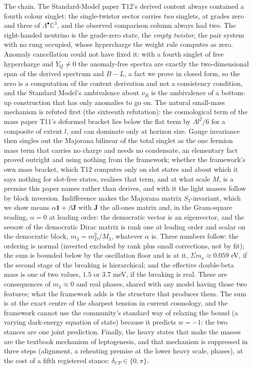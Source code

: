 \documentclass[11pt]{article}
\theoremstyle{definition}
\theoremstyle{plain}
\providecommand{\C}{}\renewcommand{\C}{\mathbb{C}}
\providecommand{\J}{}\renewcommand{\J}{\mathbf{J}}
\providecommand{\mnu}{}\renewcommand{\mnu}{\Sigma m_{\nu}}
\begin{document}
The chain. The Standard-Model paper T12's derived content always contained a fourth colour singlet: the single-twistor sector carries \emph{two} singlets, at grades zero and three of $\Lambda^{\bullet}\C^{3}$, and the observed comparison column always had two. The right-handed neutrino is the grade-zero state, the \emph{empty twistor}, the pair system with no rung occupied, whose hypercharge the weight rule computes as zero. Anomaly cancellation could not have fixed it: with a fourth singlet of free hypercharge and $Y_{Q} \neq 0$ the anomaly-free spectra are exactly the two-dimensional span of the derived spectrum and $B - L$, a fact we prove in closed form, so the zero is a computation of the content derivation and not a consistency condition, and the Standard Model's ambivalence about $\nu_{R}$ is the ambivalence of a bottom-up construction that has only anomalies to go on. The natural small-mass mechanism is refuted first (the sixteenth refutation): the cosmological term of the mass paper T11's deformed bracket lies below the flat term by $\Lambda l^{2}/6$ for a composite of extent $l$, and can dominate only at horizon size. Gauge invariance then singles out the Majorana bilinear of the total singlet as the one fermion mass term that carries no charge and needs no condensate, an elementary fact proved outright and using nothing from the framework; whether the framework's own mass bracket, which T12 computes only on slot states and about which it says nothing for slot-free states, realises that term, and at what scale $M$, is a premise this paper names rather than derives, and with it the light masses follow by block inversion. Indifference makes the Majorana matrix $S_{3}$-invariant, which we show means $\alpha\mathbf{1} + \beta\J$ with $\J$ the all-ones matrix and, in the Gram-square reading, $\alpha = 0$ at leading order: the democratic vector is an eigenvector, and the seesaw of the democratic Dirac matrix is rank one at leading order and scalar on the democratic block, $m_{3} = m_{D}^{2}/M_{3}$, whatever $\alpha$ is. Three numbers follow: the ordering is normal (inverted excluded by rank plus small corrections, not by fit); the sum is bounded below by the oscillation floor and is at it, $\mnu \approx 0.059$ eV, if the second stage of the breaking is hierarchical; and the effective double-beta mass is one of two values, $1.5$ or $3.7$ meV, if the breaking is real. These are consequences of $m_{1} \approx 0$ and real phases, shared with any model having those two features; what the framework adds is the structure that produces them. The sum is at the exact centre of the sharpest tension in current cosmology, and the framework cannot use the community's standard way of relaxing the bound (a varying dark-energy equation of state) because it predicts $w = -1$: the two stances are one joint prediction. Finally, the heavy states that make the masses are the textbook mechanism of leptogenesis, and that mechanism is suppressed in three steps (alignment, a reheating premise at the lower heavy scale, phases), at the cost of a fifth registered stance: $\delta_{CP} \in \{0, \pi\}$.
\end{document}
